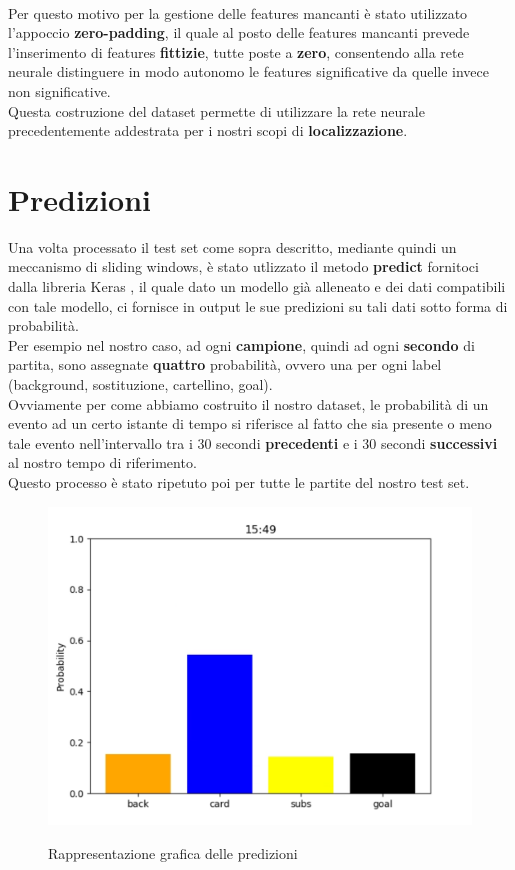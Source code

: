\\Per questo motivo per la gestione delle features mancanti è stato utilizzato l'appoccio \textbf{zero-padding}, il quale al posto delle features mancanti prevede l'inserimento di features \textbf{fittizie}, tutte poste a \textbf{zero}, consentendo alla rete neurale distinguere in modo autonomo le features significative da quelle invece non significative.
\\Questa costruzione del dataset permette di utilizzare la rete neurale precedentemente addestrata per i nostri scopi di \textbf{localizzazione}.
\section{Predizioni}
Una volta processato il test set come sopra descritto, mediante quindi un meccanismo di sliding windows, è stato utlizzato il metodo \textbf{predict} fornitoci dalla libreria Keras \cite{chollet2015keras}, il quale dato un modello già alleneato e dei dati compatibili con tale modello, ci fornisce in output le sue predizioni su tali dati sotto forma di probabilità. 
\\Per esempio nel nostro caso, ad ogni \textbf{campione}, quindi ad ogni \textbf{secondo} di partita, sono assegnate \textbf{quattro} probabilità, ovvero una per ogni label (background, sostituzione, cartellino, goal).
\\Ovviamente per come abbiamo costruito il nostro dataset, le probabilità di un evento ad un certo istante di tempo si riferisce al fatto che sia presente o meno tale evento nell'intervallo tra i 30 secondi \textbf{precedenti} e i 30 secondi \textbf{successivi} al nostro tempo di riferimento.
\\Questo processo è stato ripetuto poi per tutte le partite del nostro test set.
\begin{figure}[ht]
\centering
\caption{Rappresentazione grafica delle predizioni}
\includegraphics[width=\linewidth]{img/predict.png}
\label{figure : predict}
\end{figure}
